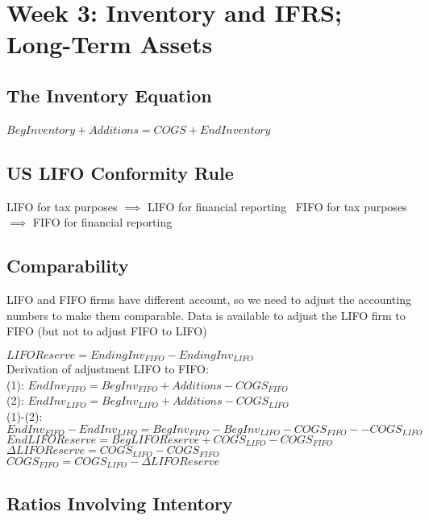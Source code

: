 \section*{Week 3: Inventory and IFRS; Long-Term Assets}

\subsection*{The Inventory Equation}

$BegInventory + Additions = COGS + EndInventory$ \

\subsection*{US LIFO Conformity Rule}
LIFO for tax purposes $\implies$ LIFO for financial reporting \
FIFO for tax purposes $\implies$ FIFO for financial reporting \

\subsection*{Comparability}
LIFO and FIFO firms have different account, so we need to adjust the accounting numbers to make them comparable.  Data is available to adjust the LIFO firm to FIFO (but not to adjust FIFO to LIFO)

$LIFO Reserve = EndingInv_{FIFO} - EndingInv_{LIFO}$ \\

Derivation of adjustment LIFO to FIFO:\\
(1): $EndInv_{FIFO} = BegInv_{FIFO} + Additions - COGS_{FIFO}$  \\
(2): $EndInv_{LIFO} = BegInv_{LIFO} + Additions - COGS_{LIFO}$  \\
(1)-(2):\\
$EndInv_{FIFO} -EndInv_{LIFO} = BegInv_{FIFO} - BegInv_{LIFO} - COGS_{FIFO} - - COGS_{LIFO}$ \\
$EndLIFOReserve = BegLIFOReserve+ COGS_{LIFO} - COGS_{FIFO}$ \\

$\Delta LIFOReserve = COGS_{LIFO} - COGS_{FIFO}$ \\

$ COGS_{FIFO} = COGS_{LIFO} - \Delta LIFOReserve  $


\subsection*{Ratios Involving Intentory}

